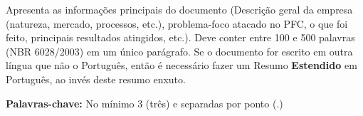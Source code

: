  Apresenta as informações principais do documento (Descrição geral da empresa (natureza, mercado, processos, etc.), problema-foco atacado no PFC, o que foi feito, principais resultados atingidos, etc.). Deve conter entre 100 e 500 palavras (NBR 6028/2003) em um único parágrafo. Se o documento for escrito em outra língua que não o Português, então é necessário fazer um Resumo \textbf{Estendido} em Português, ao invés deste resumo enxuto.

\vspace{\onelineskip}

\noindent 

\textbf{Palavras-chave:} No mínimo 3 (três) e separadas por ponto (.) 